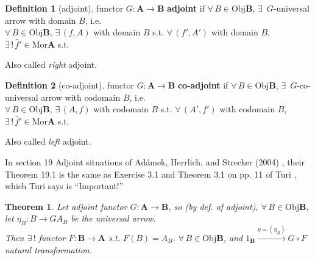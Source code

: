 \documentclass[twoside,landscape,10pt]{amsart}
\theoremstyle{plain}
\newtheorem{theorem}{Theorem}
\theoremstyle{definition}
\newtheorem{definition}{Definition}
\theoremstyle{remark}
\begin{document}
\begin{multicols*}{2}
\begin{definition}[adjoint]
  functor $G : \mathbf{A} \to \mathbf{B}$ \textbf{adjoint} if $\forall \, B \in \text{Obj}\mathbf{B}$, $\exists \, $ $G$-universal arrow with domain $B$, i.e. \\
$\forall \, B\in \text{Obj}\mathbf{B}$, $\exists \, (f,A)$ with domain $B$ s.t. $\forall \, (f',A')$ with domain $B$, $\exists \, ! \, \widehat{f}' \in \text{Mor}\mathbf{A}$ s.t.


Also called \emph{right} adjoint.
\end{definition}

\begin{definition}[co-adjoint]
functor $G: \mathbf{A} \to \mathbf{B}$  \textbf{co-adjoint} if $\forall \, B \in \text{Obj}\mathbf{B}$, $\exists \, $ $G$-co-universal arrow with codomain $B$, i.e. \\
$\forall \, B\in \text{Obj}\mathbf{B}$, $\exists \, (A,f)$ with codomain $B$ s.t. $\forall \, (A',f')$ with codomain $B$, $\exists \, ! \, \widehat{f}' \in \text{Mor}\mathbf{A}$ s.t.


Also called \emph{left} adjoint.
\end{definition}

In section 19 Adjoint situations of Ad\'{a}mek, Herrlich, and Strecker (2004) \cite{AHS2004}, their Theorem 19.1 is the same as Exercise 3.1 and Theorem 3.1 on pp. 11 of Turi \cite{Turi2001}, which Turi says is ``Important!''

\begin{theorem}
  Let adjoint functor $G: \mathbf{A} \to \mathbf{B}$, so (by def. of adjoint), $\forall \, B \in \text{Obj}\mathbf{B}$, let $\eta_B:B \to GA_B$ be the universal arrow.  \\
Then $\exists \, !$ functor $F:\mathbf{B} \to \mathbf{A}$ s.t. $F(B) = A_B$.  $\forall \, B \in \text{Obj}\mathbf{B}$, and $1_{\mathbf{B}} \xrightarrow{ \eta = (\eta_B)} G\circ F$ natural transformation.  


\end{theorem}
\end{multicols*}
\end{document}
